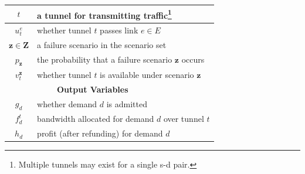 \documentclass[sigconf]{acmart}
\begin{document}
\begin{table}[h!]
\begin{tabular}{ccccccc}
\hline
$t$ &\multicolumn{6}{|l}{a tunnel for transmitting traffic\footnote{Multiple tunnels may exist for a single s-d pair.}}\\
\hline
$u_t^e$ &\multicolumn{6}{|l}{whether tunnel $t$ passes link $e \in E$}\\
\hline
$\bm{z}\in \bm{Z}$ &\multicolumn{6}{|l}{a failure scenario in the scenario set}\\
\hline
$p_{\bm{z}}$ &\multicolumn{6}{|l}{the probability that a failure scenario $\bm{z}$ occurs}\\
\hline
$v_t^{\bm{z}}$ &\multicolumn{6}{|l}{whether tunnel $t$ is available under scenario $\bm{z}$}\\
 \hline
\hline

&\textbf{Output Variables}\\
\hline
$g_d$& \multicolumn{6}{|l}{whether demand $d$ is admitted}\\
\hline
$f_d^t$& \multicolumn{6}{|l}{bandwidth allocated for demand $d$ over tunnel $t$}\\
\hline
$h_d$& \multicolumn{6}{|l}{profit (after refunding)  for demand $d$}\\
\bottomrule
\bottomrule
\end{tabular}
\end{table}
\end{document}

